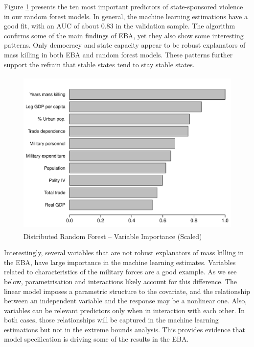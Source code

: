 \documentclass[a4paper,12pt]{article}
\begin{document}
Figure \ref{fig:drfuv} presents the ten most important predictors of state-sponsored violence in our random forest models. In general, the machine learning estimations have a good fit, with an AUC of about 0.83 in the validation sample. The algorithm confirms some of the main findings of EBA, yet they also show some interesting patterns. Only democracy and state capacity appear to be robust explanators of mass killing in both EBA and random forest models. These patterns further support the refrain that stable states tend to stay stable states. 

\begin{figure}[ht]
    \centering
    \includegraphics[width=.8\textwidth, height=8.25cm]{images/rf-mk.pdf}
    \caption{Distributed Random Forest -- Variable Importance (Scaled)}
    \label{fig:drfuv}
\end{figure}
	
Interestingly, several variables that are not robust explanators of mass killing in the EBA, have large importance in the machine learning estimates. Variables related to characteristics of the military forces are a good example. As we see below, parametrisation and interactions likely account for this difference. The linear model imposes a parametric structure to the covariate, and the relationship between an independent variable and the response may be a nonlinear one. Also, variables can be relevant predictors only when in interaction with each other. In both cases, those relationships will be captured in the machine learning estimations but not in the extreme bounds analysis. This provides evidence that model specification is driving some of the results in the EBA. 

\end{document}
